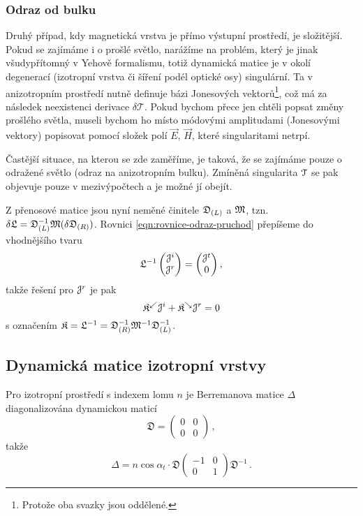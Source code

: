 \subsubsection*{Odraz od bulku}

Druhý případ, kdy magnetická vrstva je přímo výstupní prostředí, je složitější.
Pokud se zajímáme i o prošlé světlo, narážíme na problém, který je jinak všudypřítomný v Yehově formalismu, totiž dynamická matice je v okolí degenerací (izotropní vrstva či šíření podél optické osy) singulární.
Ta v anizotropním prostředí nutně definuje bázi Jonesových vektorů\footnote{Protože oba svazky jsou oddělené.}, což má za následek neexistenci derivace $\delta\mathcal{T}$.
Pokud bychom přece jen chtěli popsat změny prošlého světla, museli bychom ho místo módovými amplitudami (Jonesovými vektory) popisovat pomocí složek polí $\vec{E}$, $\vec{H}$, které singularitami netrpí.

Častější situace, na kterou se zde zaměříme, je taková, že se zajímáme pouze o odražené světlo (odraz na anizotropním bulku).
Zmíněná singularita $\mathcal{T}$ se pak objevuje pouze v mezivýpočtech a je možné jí obejít.

Z přenosové matice jsou nyní neměné činitele $\mathfrak{D}_{(L)}$ a $\mathfrak{M}$, tzn. $\delta\mathfrak{L}=\mathfrak{D}_{(L)}^{-1}\mathfrak{M}(\delta\mathfrak{D}_{(R)})$.
Rovnici \eqref{eqn:rovnice-odraz-pruchod} přepíšeme do vhodnějšího tvaru
\begin{equation}
    \mathfrak{L}^{-1} \begin{pmatrix} \mathcal{J}^i \\ \mathcal{J}^r \end{pmatrix}
    = \begin{pmatrix} \mathcal{J}^t \\ 0 \end{pmatrix} ,
\end{equation}
takže řešení pro $\mathcal{J}^r$ je pak
\begin{equation}
    \mathfrak{K}^\swarrow \mathcal{J}^i + \mathfrak{K}^\searrow \mathcal{J}^r = 0
\end{equation}
s označením $\mathfrak{K}=\mathfrak{L}^{-1} = \mathfrak{D}_{(R)}^{-1}\mathfrak{M}^{-1}\mathfrak{D}_{(L)}^{-1}$.



\subsection*{Dynamická matice izotropní vrstvy}

Pro izotropní prostředí s indexem lomu $n$ je Berremanova matice $\Delta$ diagonalizována dynamickou maticí
\begin{equation}
    \mathfrak{D} = \begin{pmatrix} 0&0\\0&0 \end{pmatrix} \,,
\end{equation}
takže
\begin{equation}
    \Delta = n\cos\alpha_t \cdot\mathfrak{D} \begin{pmatrix} -1&0\\0&1 \end{pmatrix} \mathfrak{D}^{-1} \,.
\end{equation}

